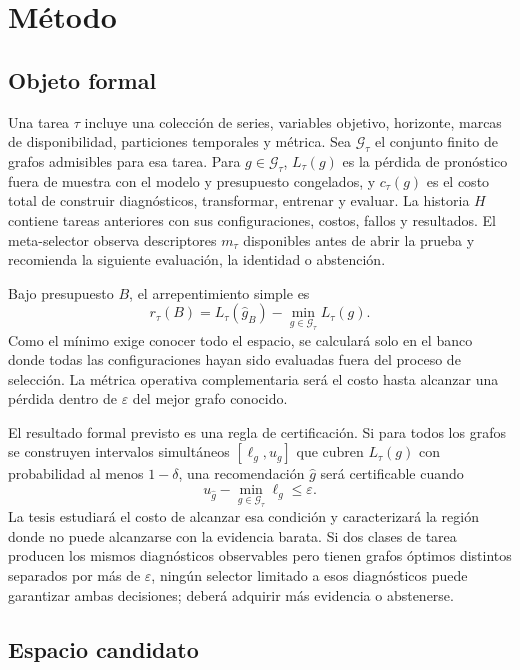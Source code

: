 \documentclass[11pt,letterpaper]{article}
\begin{document}
\section{Método}

\subsection{Objeto formal}

Una tarea $\tau$ incluye una colección de series, variables objetivo, horizonte, marcas de disponibilidad, particiones temporales y métrica.
Sea $\mathcal{G}_\tau$ el conjunto finito de grafos admisibles para esa tarea.
Para $g\in\mathcal{G}_\tau$, $L_\tau(g)$ es la pérdida de pronóstico fuera de muestra con el modelo y presupuesto congelados, y $c_\tau(g)$ es el costo total de construir diagnósticos, transformar, entrenar y evaluar.
La historia $H$ contiene tareas anteriores con sus configuraciones, costos, fallos y resultados.
El meta-selector observa descriptores $m_\tau$ disponibles antes de abrir la prueba y recomienda la siguiente evaluación, la identidad o abstención.

Bajo presupuesto $B$, el arrepentimiento simple es
\begin{equation}
 r_\tau(B)=L_\tau(\hat g_B)-\min_{g\in\mathcal{G}_\tau} L_\tau(g).
\end{equation}
Como el mínimo exige conocer todo el espacio, se calculará solo en el banco donde todas las configuraciones hayan sido evaluadas fuera del proceso de selección.
La métrica operativa complementaria será el costo hasta alcanzar una pérdida dentro de $\varepsilon$ del mejor grafo conocido.

El resultado formal previsto es una regla de certificación.
Si para todos los grafos se construyen intervalos simultáneos $[\ell_g,u_g]$ que cubren $L_\tau(g)$ con probabilidad al menos $1-\delta$, una recomendación $\hat g$ será certificable cuando
\begin{equation}
  u_{\hat g}-\min_{g\in\mathcal G_\tau}\ell_g\leq\varepsilon.
\end{equation}
La tesis estudiará el costo de alcanzar esa condición y caracterizará la región donde no puede alcanzarse con la evidencia barata.
Si dos clases de tarea producen los mismos diagnósticos observables pero tienen grafos óptimos distintos separados por más de $\varepsilon$, ningún selector limitado a esos diagnósticos puede garantizar ambas decisiones; deberá adquirir más evidencia o abstenerse.

\subsection{Espacio candidato}
\end{document}
